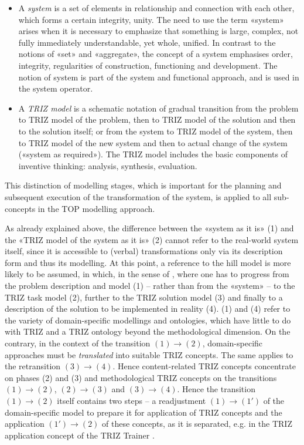 \documentclass[11pt,a4paper]{article}
\begin{document}
\begin{itemize}[noitemsep]
\item A \emph{system} is a set of elements in relationship and connection with
  each other, which forms a certain integrity, unity. The need to use the term
  «system» arises when it is necessary to emphasize that something is large,
  complex, not fully immediately understandable, yet whole, unified. In
  contrast to the notions of «set» and «aggregate», the concept of a system
  emphasises order, integrity, regularities of construction, functioning and
  development. The notion of system is part of the system and functional
  approach, and is used in the system operator.
\item A \emph{TRIZ model} is a schematic notation of gradual transition
  from the problem to TRIZ model of the problem, then to TRIZ model of the
  solution and then to the solution itself; or from the system to TRIZ model
  of the system, then to TRIZ model of the new system and then to actual
  change of the system («system as required»). The TRIZ model includes the
  basic components of inventive thinking: analysis, synthesis, evaluation.
\end{itemize}
This distinction of modelling stages, which is important for the planning and
subsequent execution of the transformation of the system, is applied to all
sub-concepts in the TOP modelling approach.

As already explained above, the difference between the «system as it is» (1)
and the «TRIZ model of the system as it is» (2) cannot refer to the real-world
system itself, since it is accessible to (verbal) transformations only via its
description form and thus its modelling. At this point, a reference to the
hill model is more likely to be assumed, in which, in the sense of \cite{TT},
where one has to progress from the problem description and model (1) -- rather
than from the «system» -- to the TRIZ task model (2), further to the TRIZ
solution model (3) and finally to a description of the solution to be
implemented in reality (4). (1) and (4) refer to the variety of
domain-specific modellings and ontologies, which have little to do with TRIZ
and a TRIZ ontology beyond the methodological dimension.  On the contrary, in
the context of the transition $(1) \to (2)$, domain-specific approaches must
be \emph{translated} into suitable TRIZ concepts.  The same applies to the
retransition $(3) \to (4)$. Hence content-related TRIZ concepts concentrate on
phases (2) and (3) and methodological TRIZ concepts on the transitions $(1)
\to (2)$, $(2) \to (3)$ and $(3) \to (4)$. Hence the transition $(1) \to (2)$
itself contains two steps -- a readjustment $(1) \to (1')$ of the
domain-specific model to prepare it for application of TRIZ concepts and the
application $(1') \to (2)$ of these concepts, as it is separated, e.g. in the
TRIZ application concept of the TRIZ Trainer \cite{TT}.
\end{document}
